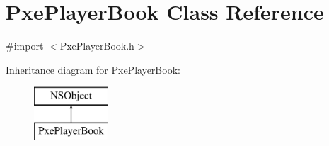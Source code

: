 \hypertarget{interface_pxe_player_book}{\section{Pxe\-Player\-Book Class Reference}
\label{interface_pxe_player_book}
}


{\ttfamily \#import $<$Pxe\-Player\-Book.\-h$>$}

Inheritance diagram for Pxe\-Player\-Book\-:\begin{figure}[H]
\begin{center}
\leavevmode
\includegraphics[height=2.000000cm]{interface_pxe_player_book}
\end{center}
\end{figure}
